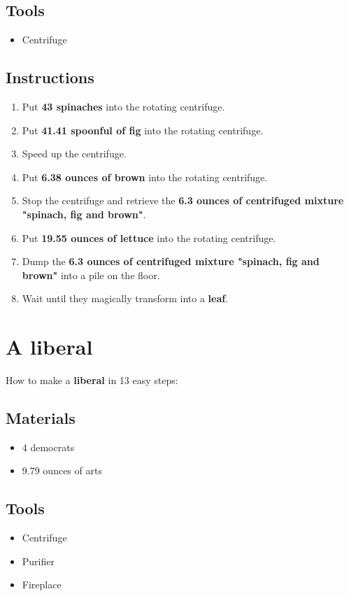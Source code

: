 \documentclass{article}
\begin{document}
\subsection{Tools}\begin{itemize}
\item 
Centrifuge
\end{itemize}
\subsection{Instructions}\begin{enumerate}
\item 
Put \textbf{43 spinaches} into the rotating centrifuge.
\item 
Put \textbf{41.41 spoonful of fig} into the rotating centrifuge.
\item 
Speed up the centrifuge.
\item 
Put \textbf{6.38 ounces of brown} into the rotating centrifuge.
\item 
Stop the centrifuge and retrieve the \textbf{6.3 ounces of centrifuged mixture "spinach, fig and brown"}.
\item 
Put \textbf{19.55 ounces of lettuce} into the rotating centrifuge.
\item 
Dump the \textbf{6.3 ounces of centrifuged mixture "spinach, fig and brown"} into a pile on the floor.
\item 
Wait until they magically transform into a \textbf{leaf}.
\end{enumerate}
\newpage
\section{A liberal}How to make a \textbf{liberal} in 13 easy steps:

\subsection{Materials}\begin{itemize}
\item 
4 democrats
\item 
9.79 ounces of arts
\end{itemize}
\subsection{Tools}\begin{itemize}
\item 
Centrifuge
\item 
Purifier
\item 
Fireplace
\end{itemize}
\end{document}
